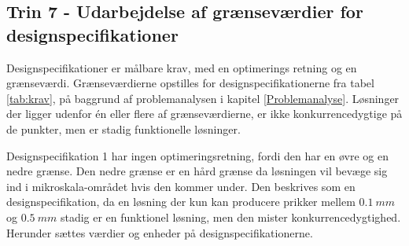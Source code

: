 \subsection{Trin 7 - Udarbejdelse af grænseværdier for designspecifikationer} \label{Trin 7} 

Designspecifikationer er målbare krav, med en optimerings retning og en grænseværdi. Grænseværdierne opstilles for designspecifikationerne fra tabel \ref{tab:krav}, på baggrund af problemanalysen i kapitel \ref{Problemanalyse}. Løsninger der ligger udenfor én eller flere af grænseværdierne, er ikke konkurrencedygtige på de punkter, men er stadig funktionelle løsninger.

Designspecifikation 1 har ingen optimeringsretning, fordi den har en øvre og en nedre grænse. Den nedre grænse er en hård grænse da løsningen vil bevæge sig ind i mikroskala-området hvis den kommer under. Den beskrives som en designspecifikation, da en løsning der kun kan producere prikker mellem \(\SI{0,1}{mm}\) og \(\SI{0,5}{mm}\) stadig er en funktionel løsning, men den mister konkurrencedygtighed. Herunder sættes værdier og enheder på designspecifikationerne.




